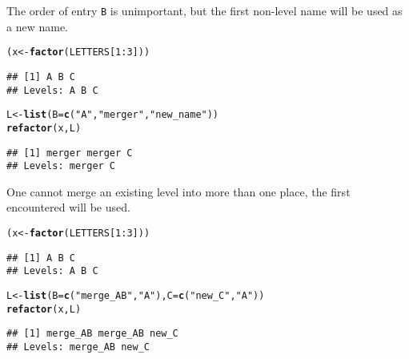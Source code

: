 \documentclass{article}\usepackage[]{graphicx}\usepackage[]{color}
\makeatletter
\newcommand{\hlnum}[1]{\textcolor[rgb]{0.686,0.059,0.569}{#1}}%
\newcommand{\hlstr}[1]{\textcolor[rgb]{0.192,0.494,0.8}{#1}}%
\newcommand{\hlopt}[1]{\textcolor[rgb]{0,0,0}{#1}}%
\newcommand{\hlstd}[1]{\textcolor[rgb]{0.345,0.345,0.345}{#1}}%
\newcommand{\hlkwb}[1]{\textcolor[rgb]{0.69,0.353,0.396}{#1}}%
\newcommand{\hlkwc}[1]{\textcolor[rgb]{0.333,0.667,0.333}{#1}}%
\newcommand{\hlkwd}[1]{\textcolor[rgb]{0.737,0.353,0.396}{\textbf{#1}}}%
\newenvironment{kframe}{%
 \def\at@end@of@kframe{}%
 \ifinner\ifhmode%
  \def\at@end@of@kframe{\end{minipage}}%
  \begin{minipage}{\columnwidth}%
 \fi\fi%
 \def\FrameCommand##1{\hskip\@totalleftmargin \hskip-\fboxsep
 \colorbox{shadecolor}{##1}\hskip-\fboxsep
     \hskip-\linewidth \hskip-\@totalleftmargin \hskip\columnwidth}%
 \MakeFramed {\advance\hsize-\width
   \@totalleftmargin\z@ \linewidth\hsize
   \@setminipage}}%
 {\par\unskip\endMakeFramed%
 \at@end@of@kframe}
\newenvironment{knitrout}{}{} %
\newcommand{\code}{\texttt}
\makeatother
\begin{document}
The order of entry \code{B} is unimportant, but the first non-level name will be used as a new name.
\begin{knitrout}
\color{fgcolor}\begin{kframe}
\begin{alltt}
\hlstd{(x} \hlkwb{<-} \hlkwd{factor}\hlstd{(LETTERS[}\hlnum{1}\hlopt{:}\hlnum{3}\hlstd{]))}
\end{alltt}
\begin{verbatim}
## [1] A B C
## Levels: A B C
\end{verbatim}
\begin{alltt}
\hlstd{L} \hlkwb{<-} \hlkwd{list}\hlstd{(}\hlkwc{B}\hlstd{=}\hlkwd{c}\hlstd{(}\hlstr{"A"}\hlstd{,} \hlstr{"merger"}\hlstd{,} \hlstr{"new_name"}\hlstd{))}
\hlkwd{refactor}\hlstd{(x,L)}
\end{alltt}


{\ttfamily\noindent\color{warningcolor}{\#\# Warning in refactor(x, L): [refactor] Multiple new names for level 'B'. Only the first one will be used.}}\begin{verbatim}
## [1] merger merger C     
## Levels: merger C
\end{verbatim}
\end{kframe}
\end{knitrout}
One cannot merge an existing level into more than one place, the first encountered will be used.
\begin{knitrout}
\color{fgcolor}\begin{kframe}
\begin{alltt}
\hlstd{(x} \hlkwb{<-} \hlkwd{factor}\hlstd{(LETTERS[}\hlnum{1}\hlopt{:}\hlnum{3}\hlstd{]))}
\end{alltt}
\begin{verbatim}
## [1] A B C
## Levels: A B C
\end{verbatim}
\begin{alltt}
\hlstd{L} \hlkwb{<-} \hlkwd{list}\hlstd{(}\hlkwc{B}\hlstd{=}\hlkwd{c}\hlstd{(}\hlstr{"merge_AB"}\hlstd{,}\hlstr{"A"}\hlstd{),} \hlkwc{C}\hlstd{=}\hlkwd{c}\hlstd{(}\hlstr{"new_C"}\hlstd{,} \hlstr{"A"}\hlstd{))}
\hlkwd{refactor}\hlstd{(x,L)}
\end{alltt}


{\ttfamily\noindent\color{warningcolor}{\#\# Warning in refactor(x, L): [refactor] Key 'C' has entries used previously. These will be skipped}}\begin{verbatim}
## [1] merge_AB merge_AB new_C   
## Levels: merge_AB new_C
\end{verbatim}
\end{kframe}
\end{knitrout}
\end{document}
